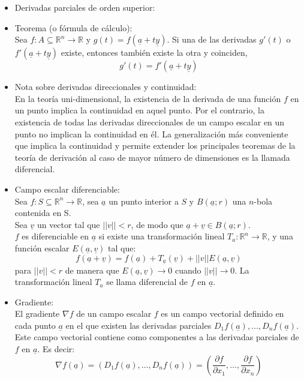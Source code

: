 \documentclass[a4paper, 12pt]{article}
\begin{document}
\begin{itemize}
\item Derivadas parciales de orden superior:\\

\item Teorema (o fórmula de cálculo): \\
Sea $f: A\subseteq \mathbb{R}^n \to \mathbb{R}$ y $g(t)=f(\underline{a}+t\underline{y})$. Si una de las derivadas $g'(t)$ o $f'(\underline{a}+t\underline{y})$ existe, entonces también existe la otra y coinciden, \\
$$g'(t)=f'(\underline{a}+t\underline{y})$$

\item Nota sobre derivadas direccionales y continuidad: \\
En la teoría uni-dimensional, la existencia de la derivada de una función $f$ en un punto implica la continuidad en aquel punto. Por el contrario, la existencia de todas las derivadas direccionales de un campo escalar en un punto no implican la continuidad en él. La generalización más conveniente que implica la continuidad y permite extender los principales teoremas de la teoría de derivación al caso de mayor número de dimensiones es la llamada diferencial.

\item Campo escalar diferenciable: \\ %
Sea $f:S\subseteq\mathbb{R}^n \to \mathbb{R}$, sea $\underline{a}$ un punto interior a $S$ y $B(\underline{a};r)$ una $n$-bola contenida en S. \\
Sea $\underline{v}$ un vector tal que $||v||<r$, de modo que $\underline{a}+\underline{v} \in B(\underline{a};r)$. \\
$f$ es diferenciable en $\underline{a}$ si existe una transformación lineal $T_a:\mathbb{R}^n \to \mathbb{R}$, y una función escalar $E(\underline{a},\underline{v})$ tal que:
$$f(\underline{a}+\underline{v})=f(\underline{a})+T_{\underline{a}}(\underline{v})+||v|| E(\underline{a},\underline{v})$$
para $||v||<r$ de manera que $E(\underline{a},\underline{v}) \to 0$ cuando $||v|| \to 0$. La transformación lineal $T_a$ se llama diferencial de $f$ en $\underline{a}$.

\item Gradiente:\\
El gradiente $\nabla f$ de un campo escalar $f$ es un campo vectorial definido en cada punto $\underline{a}$ en el que existen las derivadas parciales $D_1f(\underline{a}),\dots,D_nf(\underline{a})$. Este campo vectorial contiene como componentes a las derivadas parciales de $f$ en $\underline{a}$. Es decir: $$\nabla f(\underline{a})=(D_1f(\underline{a}),\dots,D_nf(\underline{a}))=\left(\frac{\partial f}{\partial x_1},\dots,\frac{\partial f}{\partial x_n}\right) $$


\end{itemize}
\end{document}
